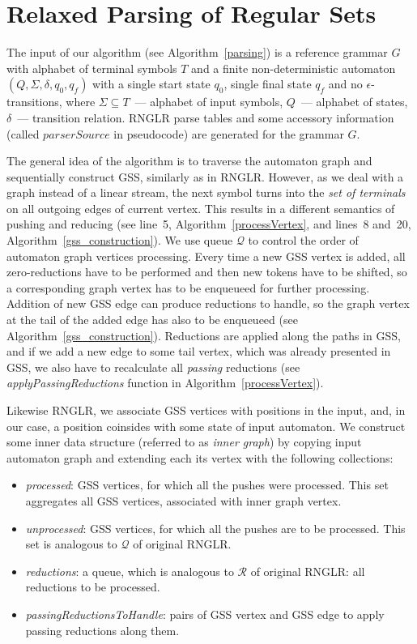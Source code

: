 \section{Relaxed Parsing of Regular Sets}

The input of our algorithm (see Algorithm~\ref{parsing}) is a reference grammar $G$ with alphabet of terminal symbols $T$ 
and a finite non-deterministic automaton $(Q, \Sigma, \delta, q_0, q_f)$ with a single start state $q_0$, single final state $q_f$ 
and no $\epsilon$-transitions, where $\Sigma \subseteq T$~--- alphabet of input symbols, $Q$~--- alphabet of states, 
$\delta$~--- transition relation. RNGLR parse tables and some accessory information (called $parserSource$ in pseudocode) 
are generated for the grammar $G$. 

The general idea of the algorithm is to traverse the automaton graph and sequentially construct GSS, similarly as in RNGLR.
However, as we deal with a graph instead of a linear stream, the next symbol turns into the \emph{set of terminals} on 
all outgoing edges of current vertex. This results in a different semantics of pushing and reducing (see line~5, 
Algorithm~\ref{processVertex}, and lines~8 and~20, Algorithm~\ref{gss_construction}). We use queue $\mathcal Q$ to control the 
order of automaton graph vertices processing. Every time a new GSS vertex is added, all zero-reductions have to be performed 
and then new tokens have to be shifted, so a corresponding graph vertex has to be enqueueed for further processing. 
Addition of new GSS edge can produce reductions to handle, so the graph vertex at the tail of the added edge has 
also to be enqueueed (see Algorithm~\ref{gss_construction}). Reductions are applied along the paths in GSS, and if we add
a new edge to some tail vertex, which was already presented in GSS, we also have to recalculate all \emph{passing} reductions
(see \emph{applyPassingReductions} function in Algorithm~\ref{processVertex}).

Likewise RNGLR, we associate GSS vertices with positions in the input,
and, in our case, a position coinsides with some state of input automaton. We construct some
inner data structure (referred to as \emph{inner graph}) by copying input automaton graph and 
extending each its vertex with the following collections: 

\begin{itemize}
  \item \emph{processed}: GSS vertices, for which all the pushes were processed. 
   This set aggregates all GSS vertices, associated with inner graph vertex.
  \item \emph{unprocessed}: GSS vertices, for which all the pushes are to be processed. 
   This set is analogous to $\mathcal{Q}$ of original RNGLR.
  \item \emph{reductions}: a queue, which is analogous to $\mathcal{R}$ of original RNGLR: 
   all reductions to be processed.
  \item \emph{passingReductionsToHandle}: pairs of GSS vertex and GSS edge to apply 
   passing reductions along them.
\end{itemize}

